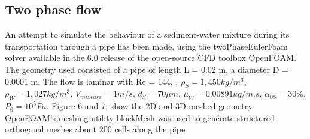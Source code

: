 \documentclass[review,3p,times,12pt]{elsarticle}
\begin{document}

\subsection{Two phase flow} \label{Two Phase}

An attempt to simulate the behaviour of a sediment-water mixture during its transportation through a pipe has been made, using the twoPhaseEulerFoam solver available in the 6.0 release of the open-source CFD toolbox OpenFOAM. The geometry used consisted of a pipe of length L = 0.02 m, a diameter D = 0.0001 m. The flow is laminar with Re = 144,  , $\rho_S= 1,450  kg/m^3$, $\rho_W= 1,027  kg/m^3$, $V_{mixture} = 1 m/s$, $d_S= 70 \mu m$, $\mu_W = 0.00891  kg/m.s$, $\alpha_{0S} = 30 \%$, $P_0=10^5  Pa$. Figure 6 and 7, show the 2D and 3D meshed geometry. OpenFOAM's meshing utility blockMesh was used to generate structured orthogonal meshes about 200 cells along the pipe.
\end{document}
